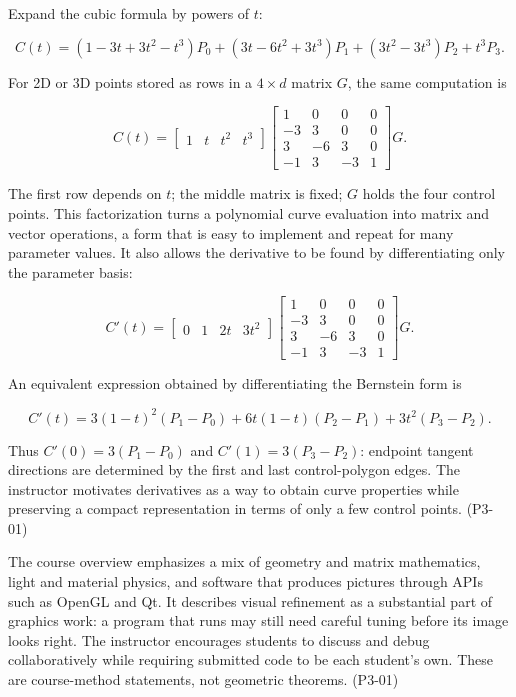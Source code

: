 Expand the cubic formula by powers of \(t\):

\[
C(t)=(1-3t+3t^2-t^3)P_0+(3t-6t^2+3t^3)P_1+(3t^2-3t^3)P_2+t^3P_3.
\]

For 2D or 3D points stored as rows in a \(4\times d\) matrix \(G\), the same computation is

\[
C(t)=\begin{bmatrix}1&t&t^2&t^3\end{bmatrix}
\begin{bmatrix}1&0&0&0\\-3&3&0&0\\3&-6&3&0\\-1&3&-3&1\end{bmatrix}G.
\]

The first row depends on \(t\); the middle matrix is fixed; \(G\) holds the four control points. This factorization turns a polynomial curve evaluation into matrix and vector operations, a form that is easy to implement and repeat for many parameter values. It also allows the derivative to be found by differentiating only the parameter basis:

\[
C'(t)=\begin{bmatrix}0&1&2t&3t^2\end{bmatrix}
\begin{bmatrix}1&0&0&0\\-3&3&0&0\\3&-6&3&0\\-1&3&-3&1\end{bmatrix}G.
\]

An equivalent expression obtained by differentiating the Bernstein form is

\[
C'(t)=3(1-t)^2(P_1-P_0)+6t(1-t)(P_2-P_1)+3t^2(P_3-P_2).
\]

Thus \(C'(0)=3(P_1-P_0)\) and \(C'(1)=3(P_3-P_2)\): endpoint tangent directions are determined by the first and last control-polygon edges. The instructor motivates derivatives as a way to obtain curve properties while preserving a compact representation in terms of only a few control points. (P3-01)

The course overview emphasizes a mix of geometry and matrix mathematics, light and material physics, and software that produces pictures through APIs such as OpenGL and Qt. It describes visual refinement as a substantial part of graphics work: a program that runs may still need careful tuning before its image looks right. The instructor encourages students to discuss and debug collaboratively while requiring submitted code to be each student's own. These are course-method statements, not geometric theorems. (P3-01)

